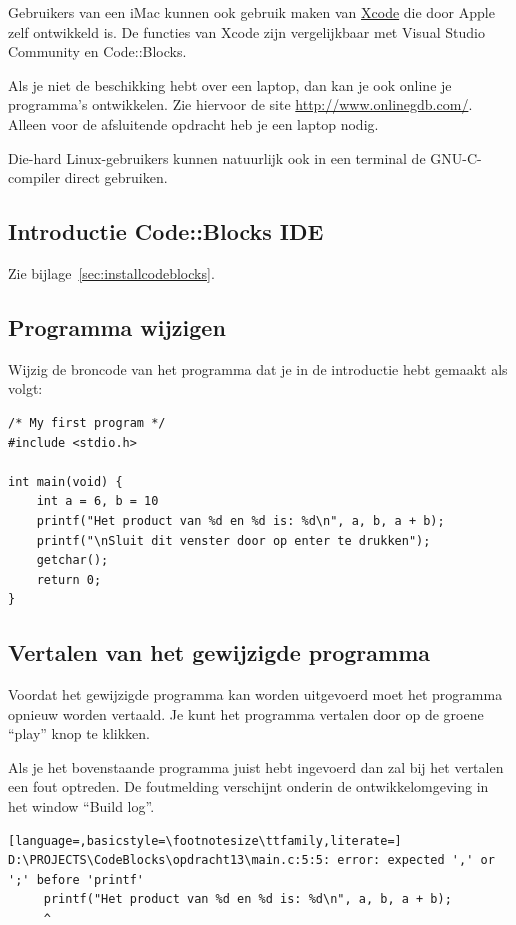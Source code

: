 \documentclass[a4paper,10pt,fleqn,twoside]{article}
\begin{document}
Gebruikers van een iMac kunnen ook gebruik maken van \href{https://developer.apple.com/xcode/}{Xcode} die door Apple zelf ontwikkeld is. De functies van Xcode zijn vergelijkbaar met Visual Studio Community en Code::Blocks.

Als je niet de beschikking hebt over een laptop, dan kan je ook online je programma's ontwikkelen. Zie hiervoor de site \url{http://www.onlinegdb.com/}. Alleen voor de afsluitende opdracht heb je een laptop nodig.

Die-hard Linux-gebruikers kunnen natuurlijk ook in een terminal de GNU-C-compiler direct gebruiken.


\subsection{Introductie Code::Blocks IDE}

Zie bijlage~\ref{sec:installcodeblocks}.

\subsection{Programma wijzigen}
Wijzig de broncode van het programma dat je in de introductie hebt gemaakt als volgt:

\begin{lstlisting}
/* My first program */
#include <stdio.h>

int main(void) {
    int a = 6, b = 10
    printf("Het product van %d en %d is: %d\n", a, b, a + b);
    printf("\nSluit dit venster door op enter te drukken");
    getchar();
    return 0;
}
\end{lstlisting}

\subsection{Vertalen van het gewijzigde programma
}Voordat het gewijzigde programma kan worden uitgevoerd moet het programma opnieuw worden vertaald. Je kunt het programma vertalen door op de groene ``play'' knop te klikken.

Als je het bovenstaande programma juist hebt ingevoerd dan zal bij het vertalen een fout optreden. De foutmelding verschijnt onderin de ontwikkelomgeving in het window ``Build log''. 

\begin{lstlisting}[language=,basicstyle=\footnotesize\ttfamily,literate=]
D:\PROJECTS\CodeBlocks\opdracht13\main.c:5:5: error: expected ',' or ';' before 'printf'
     printf("Het product van %d en %d is: %d\n", a, b, a + b);
     ^
\end{lstlisting}
\end{document}
